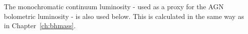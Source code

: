 The monochromatic continuum luminosity - used as a proxy for the \ac{AGN} bolometric luminosity - is also used below. 
This is calculated in the same way as in Chapter~\ref{ch:bhmass}. 










